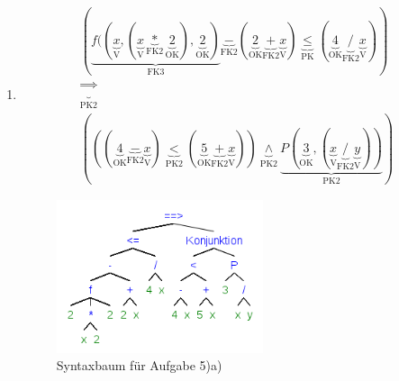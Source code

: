 \documentclass[a4paper]{article}
\begin{document}
\begin{enumerate}
		\item
		\begin{enumerate}
			\begin{equation*}
				\begin{aligned}
					( \underbrace{f((\underbrace{x}_{\text{V}}, ( \underbrace{x}_{\text{V}} \underbrace{*}_{\text{FK2}} \underbrace{2}_{\text{OK}} ), \underbrace{2}_{\text{OK}})}_{\text{FK3}} \underbrace{-}_{\text{FK2}} ( \underbrace{2}_{\text{OK}} \underbrace{+}_{\text{FK2}} \underbrace{x}_{\text{V}})\underbrace{\leq}_{\text{PK}} ( \underbrace{4}_{\text{OK}} \underbrace{/}_{\text{FK2}} \underbrace{x}_{\text{V}} )) \\ \underbrace{\Rightarrow}_{\text{PK2}} \\ (((\underbrace{4}_{\text{OK}} \underbrace{-}_{\text{FK2}} \underbrace{x}_{\text{V}}) \underbrace{<}_{\text{PK2}} (\underbrace{5}_{\text{OK}} \underbrace{+}_{\text{FK2}} \underbrace{x}_{\text{V}})) \underbrace{\land}_{\text{PK2}} \underbrace{P(\underbrace{3}_{\text{OK}}, (\underbrace{x}_{\text{V}} \underbrace{/}_{\text{FK2}} \underbrace{y}_{\text{V}}))}_{\text{PK2}})
				\end{aligned}
			\end{equation*}
			\begin{figure}[ht!]
				\begin{center}
					\includegraphics[height=45mm]{5a.png}
					\caption{Syntaxbaum für Aufgabe 5)a)}
				\end{center}
			\end{figure}
		

\end{enumerate}
\end{enumerate}
\end{document}

